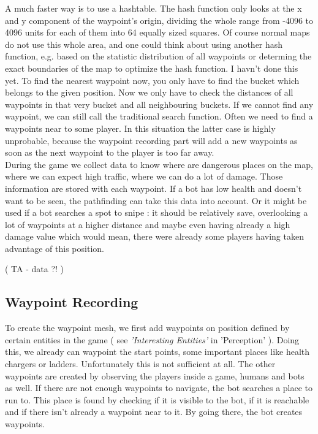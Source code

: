 \documentclass[12pt]{article}
\begin{document}
A much faster way is to use a hashtable. The hash function only looks at the x and y component of the waypoint's origin, dividing the whole range from -4096 to 4096 units for each of them into 64 equally sized squares. Of course normal maps do not use this whole area, and one could think about using another hash function, e.g. based on the statistic distribution of all waypoints or determing the exact boundaries of the map to optimize the hash function. I havn't done this yet. To find the nearest waypoint now, you only have to find the bucket which belongs to the given position. Now we only have to check the distances of all waypoints in that very bucket and all neighbouring buckets. If we cannot find any waypoint, we can still call the traditional search function. Often we need to find a waypoints near to some player. In this situation the latter case is highly unprobable, because the waypoint recording part will add a new waypoints as soon as the next waypoint to the player is too far away.\\
During the game we collect data to know where are dangerous places on the map, where we can expect high traffic, where we can do a lot of damage. Those information are stored with each waypoint. If a bot has low health and doesn't want to be seen, the pathfinding can take this data into account. Or it might be used if a bot searches a spot to snipe : it should be relatively save, overlooking a lot of waypoints at a higher distance and maybe even having already a high damage value which would mean, there were already some players having taken advantage of this position.

( TA - data ?! )

\subsection{Waypoint Recording}

To create the waypoint mesh, we first add waypoints on position defined by certain entities in the game ( see \textit{'Interesting Entities'} in 'Perception' ). Doing this, we already can waypoint the start points, some important places like health chargers or ladders. Unfortunately this is not sufficient at all. The other waypoints are created by observing the players inside a game, humans and bots as well. If there are not enough waypoints to navigate, the bot searches a place to run to. This place is found by checking if it is visible to the bot, if it is reachable and if there isn't already a waypoint near to it. By going there, the bot creates waypoints.
\end{document}
